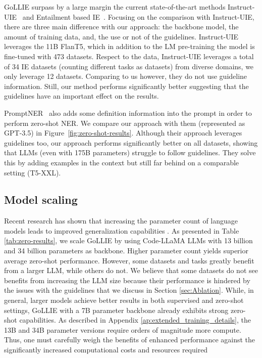 \documentclass{article} \usepackage{iclr2024_conference,times}
\begin{document}
GoLLIE surpass by a large margin the current state-of-the-art methods Instruct-UIE~\citep{DBLP:journals/corr/abs-2304-08085} and Entailment based IE~\citep{sainz-etal-2022-zs4ie}.
Focusing on the comparison with Instruct-UIE, there are three main difference with our approach: the backbone model, the amount of training data, and, the use or not of the guidelines. Instruct-UIE leverages the 11B FlanT5, which in addition to the LM pre-training the model is fine-tuned with 473 datasets. Respect to the data, Instruct-UIE leverages a total of 34 IE datasets (counting different tasks as datasets) from diverse domains, we only leverage 12 datasets. Comparing to us however, they do not use guideline information. Still, our method performs significantly better suggesting that the guidelines have an important effect on the results. 

PromptNER~\citep{ashok2023promptner} also adds some definition information into the prompt in order to perform zero-shot NER. We compare our approach with them (represented as GPT-3.5) in Figure~\ref{fig:zero-shot-results}. Although their approach leverages guidelines too, our approach performs significantly better on all datasets, showing that LLMs (even with 175B parameters) struggle to follow guidelines. They solve this by adding examples in the context but still far behind on a comparable setting (T5-XXL).


\subsection{Model scaling}
Recent research has shown that increasing the parameter count of language models leads to improved generalization capabilities \cite{DBLP:conf/nips/BrownMRSKDNSSAA20}. As presented in Table \ref{tab:zero-results}, we scale GoLLIE by using Code-LLaMA LLMs with 13 billion and 34 billion parameters as backbone. Higher parameter count yields superior average zero-shot performance. However, some datasets and tasks greatly benefit from a larger LLM, while others do not. We believe that some datasets do not see benefits from increasing the LLM size because their performance is hindered by the issues with the guidelines that we discuss in Section \ref{sec:Ablation}. While, in general, larger models achieve better results in both supervised and zero-shot settings, GoLLIE with a 7B parameter backbone already exhibits strong zero-shot capabilities. As described in Appendix \ref{ap:extended_training_details}, the 13B and 34B parameter versions require orders of magnitude more compute. Thus, one must carefully weigh the benefits of enhanced performance against the significantly increased computational costs and resources required
\end{document}

